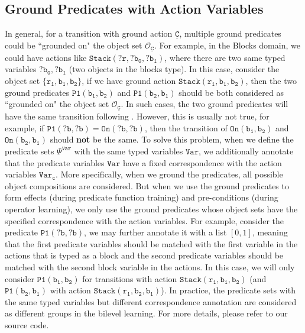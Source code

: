\subsection{Ground Predicates with Action Variables}\label{app:same_type}
In general, for a transition with ground action $\underline{\mathtt{C}}$, multiple ground predicates could be ``grounded on" the object set $\mathcal{O}_{\underline{\mathtt{C}}}$.
For example, in the Blocks domain, we could have actions like $\mathtt{Stack(?r,?b_0,?b_1)}$, where there are two same typed variables $\mathtt{?b_0,?b_1}$ (two objects in the blocks type).
In this case, consider the object set $\{\mathtt{r_1,b_1,b_2}\}$, if we have ground action $\mathtt{Stack(r_1,b_1,b_2)}$, then the two ground predicates $\mathtt{P1(b_1,b_2)}$ and $\mathtt{P1(b_2,b_1)}$ should be both considered as ``grounded on" the object set $\mathcal{O}_{\underline{\mathtt{C}}}$.
In such cases, the two ground predicates will have the same transition following .
However, this is usually not true, for example, if $\mathtt{P1(?b,?b)}=\mathtt{On(?b,?b)}$, then the transition of $\mathtt{On(b_1,b_2)}$ and $\mathtt{On(b_2,b_1)}$ should \textbf{not} be the same.
To solve this problem, when we define the predicate sets $\Psi^\mathtt{Var}$ with the same typed variables $\mathtt{Var}$, we additionally annotate that the predicate variables $\mathtt{Var}$ have a fixed correspondence with the action variables $\mathtt{Var}_\mathtt{c}$.
More specifically, when we ground the predicates, all possible object compositions are considered.
But when we use the ground predicates to form effects (during predicate function training) and pre-conditions (during operator learning), we only use the ground predicates whose object sets have the specified correspondence with the action variables.
For example, consider the predicate $\mathtt{P1(?b,?b)}$, we may further annotate it with a list $[0,1]$, meaning that the first predicate variables should be matched with the first variable in the actions that is typed as a block and the second predicate variables should be matched with the second block variable in the actions.
In this case, we will only consider $\mathtt{P1(b_1,b_2)}$ for transitions with action $\mathtt{Stack(r_1,b_1,b_2)}$ (and $\mathtt{P1(b_2,b_1)}$ with action $\mathtt{Stack(r_1,b_2,b_1)}$).
In practice, the predicate sets with the same typed variables but different correspondence annotation are considered as different groups in the bilevel learning.
For more details, please refer to our source code.


